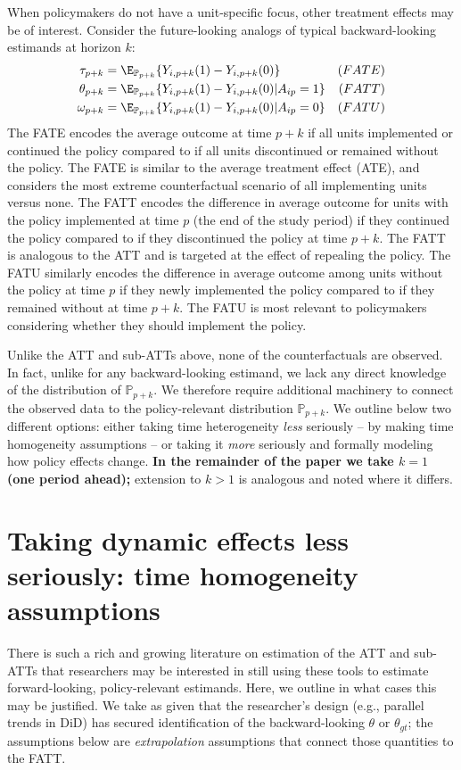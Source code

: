 \documentclass{article}
\renewcommand{\P}{\mathbb{P}}
\begin{document}
When policymakers do not have a unit-specific focus, other treatment effects may be of interest. Consider the future-looking analogs of typical backward-looking estimands at horizon $k$:
\begin{align*}
    \tau_{p+k} &= \E_{\P_{p+k}}\{Y_{i,p+k}(1) - Y_{i,p+k}(0)\} & (FATE)\\
    \theta_{p+k} &= \E_{\P_{p+k}}\{Y_{i,p+k}(1) - Y_{i,p+k}(0) | A_{ip} = 1\} & (FATT)\\
     \omega_{p+k} &= \E_{\P_{p+k}}\{Y_{i,p+k}(1) - Y_{i,p+k}(0) | A_{ip} = 0\} & (FATU)
\end{align*}
The FATE encodes the average outcome at time $p+k$ if all units implemented or continued the policy compared to if all units discontinued or remained without the policy. The FATE is similar to the average treatment effect (ATE), and considers the most extreme counterfactual scenario of all implementing units versus none. The FATT encodes the difference in average outcome for units with the policy implemented at time $p$ (the end of the study period)
if they continued the policy compared to if they discontinued the policy at time $p+k$. The FATT is analogous to the ATT and is targeted at the effect of repealing the policy. The FATU similarly encodes the difference in average outcome among units without the policy at time $p$ if they newly implemented the policy compared to if they remained without at time $p+k$. The FATU is most relevant to policymakers considering whether they should implement the policy. 

Unlike the ATT and sub-ATTs above, none of the counterfactuals are observed. In fact, unlike for any backward-looking estimand, we lack any direct knowledge of the distribution of $\P_{p+k}$. We therefore require additional machinery to connect the observed data to the policy-relevant distribution $\P_{p+k}$. We outline below two different options: either taking time heterogeneity \textit{less} seriously -- by making time homogeneity assumptions -- or taking it \textit{more} seriously and formally modeling how policy effects change. \textbf{In the remainder of the paper we take $k=1$ (one period ahead);} extension to $k > 1$ is analogous and noted where it differs. 

\section{Taking dynamic effects less seriously: time homogeneity assumptions}

There is such a rich and growing literature on estimation of the ATT and sub-ATTs \citep{wangAdvancesDifferenceindifferencesMethods2024a,sunEstimatingDynamicTreatment2021} that researchers may be interested in still using these tools to estimate forward-looking, policy-relevant estimands. Here, we outline in what cases this may be justified. We take as given that the researcher's design (e.g., parallel trends in DiD) has secured identification of the backward-looking $\theta$ or $\theta_{gt}$; the assumptions below are \emph{extrapolation} assumptions that connect those quantities to the FATT.
\end{document}
